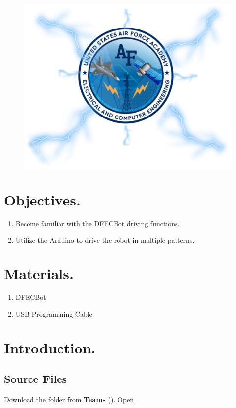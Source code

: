 \documentclass{handout}
\begin{document}
	\maketitle
	\begin{figure}[H]
	\centering
	\includegraphics[width=.75\textwidth]{Cover.PNG}
\end{figure}

	\section{Objectives.} 
	\begin{enumerate}
		\item Become familiar with the DFECBot driving functions.
		\item Utilize the Arduino to drive the robot in multiple patterns.
	\end{enumerate}
	
	\section{Materials.}
	\begin{enumerate}
		\item DFECBot
		\item USB Programming Cable
	\end{enumerate}

	
	\section{Introduction.}
	
	\subsection{Source Files}
	Download the  folder from \textbf{Teams} (). Open . 
	
\end{document}
